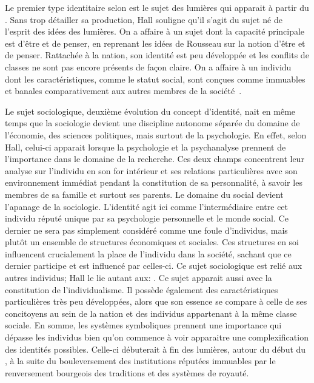 Le premier type identitaire selon \citeauthor{Hall1996a} est le sujet des lumières qui apparait à partir du .
Sans trop détailler sa production, Hall souligne qu'il s'agit du sujet né de l'esprit des idées des lumières.
On a affaire à un sujet dont la capacité principale est d'être et de penser, en reprenant les idées de Rousseau sur la notion d'être et de penser.
Rattachée à la nation, son identité est peu développée et les conflits de classes ne sont pas encore présents de façon claire.
On a affaire à un individu dont les caractéristiques, comme le statut social, sont conçues comme immuables et banales comparativement aux autres membres de la société~\citeyearpar[596]{Hall1996a}.

Le sujet sociologique, deuxième évolution du concept d'identité, nait en même temps que la sociologie devient une discipline autonome séparée du domaine de l'économie, des sciences politiques, mais surtout de la psychologie.
En effet, selon Hall, celui-ci apparait lorsque la psychologie et la psychanalyse prennent de l'importance dans le domaine de la recherche.
Ces deux champs concentrent leur analyse sur l'individu en son for intérieur et ses relations particulières avec son environnement immédiat pendant la constitution de sa personnalité, à savoir les membres de sa famille et surtout ses parents.
Le domaine du social devient l'apanage de la sociologie.
L'identité agit ici comme l'intermédiaire entre cet individu réputé unique par sa psychologie personnelle et le monde social.
Ce dernier ne sera pas simplement considéré comme une foule d'individus, mais plutôt un ensemble de structures économiques et sociales.
Ces structures en soi influencent crucialement la place de l'individu dans la société, sachant que ce dernier participe et est influencé par celles-ci.
Ce sujet sociologique est relié aux autres individus; Hall le lie autant aux: .
Ce sujet apparait aussi avec la constitution de l'individualisme.
Il possède également des caractéristiques particulières très peu développées, alors que son essence se compare à celle de ses concitoyens au sein de la nation et des individus appartenant à la même classe sociale.
En somme, les systèmes symboliques prennent une importance qui dépasse les individus bien qu'on commence à voir apparaitre une complexification des identités possibles.
Celle-ci débuterait à fin des lumières, autour du début du , à la suite du bouleversement des institutions réputées immuables par le renversement bourgeois des traditions et des systèmes de royauté. 

